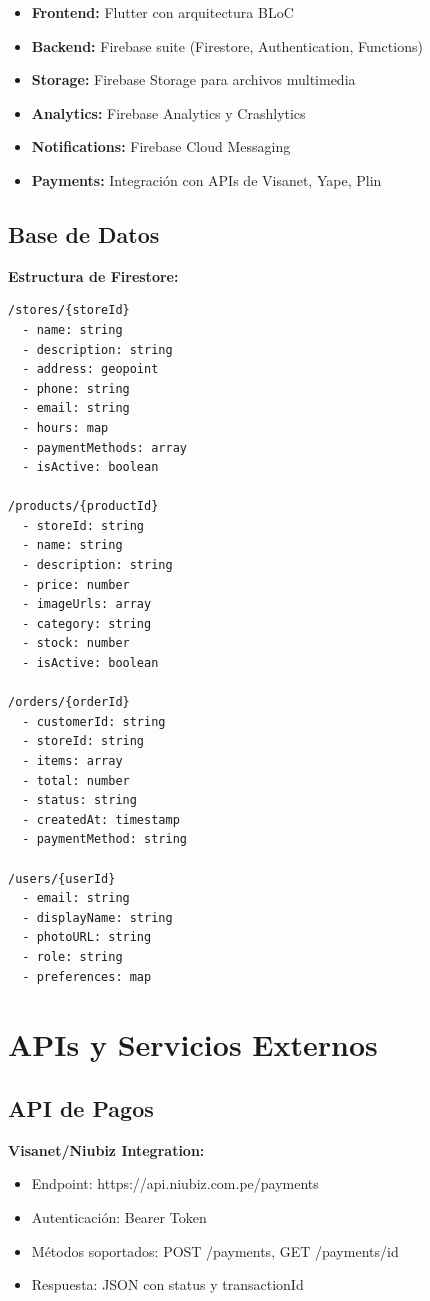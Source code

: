 \documentclass[12pt,a4paper]{report}
\begin{document}
\begin{itemize}
	\item \textbf{Frontend:} Flutter con arquitectura BLoC
	\item \textbf{Backend:} Firebase suite (Firestore, Authentication, Functions)
	\item \textbf{Storage:} Firebase Storage para archivos multimedia
	\item \textbf{Analytics:} Firebase Analytics y Crashlytics
	\item \textbf{Notifications:} Firebase Cloud Messaging
	\item \textbf{Payments:} Integración con APIs de Visanet, Yape, Plin
\end{itemize}

\subsection{Base de Datos}

\textbf{Estructura de Firestore:}

\begin{verbatim}
/stores/{storeId}
  - name: string
  - description: string
  - address: geopoint
  - phone: string
  - email: string
  - hours: map
  - paymentMethods: array
  - isActive: boolean

/products/{productId}
  - storeId: string
  - name: string
  - description: string
  - price: number
  - imageUrls: array
  - category: string
  - stock: number
  - isActive: boolean

/orders/{orderId}
  - customerId: string
  - storeId: string
  - items: array
  - total: number
  - status: string
  - createdAt: timestamp
  - paymentMethod: string

/users/{userId}
  - email: string
  - displayName: string
  - photoURL: string
  - role: string
  - preferences: map
\end{verbatim}

\section{APIs y Servicios Externos}

\subsection{API de Pagos}

\textbf{Visanet/Niubiz Integration:}
\begin{itemize}
	\item Endpoint: https://api.niubiz.com.pe/payments
	\item Autenticación: Bearer Token
	\item Métodos soportados: POST /payments, GET /payments/{id}
	\item Respuesta: JSON con status y transactionId
\end{itemize}
\end{document}
